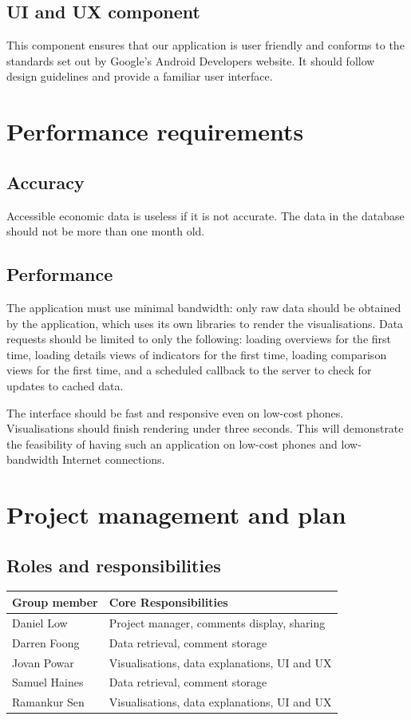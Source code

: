 \documentclass[12pt,a4paper,twoside]{article}
\begin{document}
\subsection{UI and UX component}
This component ensures that our application is user friendly and conforms to the standards set out by Google's Android Developers website. It should follow design guidelines and provide a familiar user interface.

\section{Performance requirements}

\subsection{Accuracy}
Accessible economic data is useless if it is not accurate. The data in the database should not be more than one month old.

\subsection{Performance}
The application must use minimal bandwidth: only raw data should be obtained by the application, which uses its own libraries to render the visualisations. Data requests should be limited to only the following: loading overviews for the first time, loading details views of indicators for the first time, loading comparison views for the first time, and a scheduled callback to the server to check for updates to cached data. 

The interface should be fast and responsive even on low-cost phones. Visualisations should finish rendering under three seconds. This will demonstrate the feasibility of having such an application on low-cost phones and low-bandwidth Internet connections.

\section{Project management and plan}

\subsection{Roles and responsibilities}
\setlength{\extrarowheight}{5pt}
\begin{tabular}{|m{5.5cm}|m{9.5cm}|}
\hline
\textbf{Group member} & \textbf{Core Responsibilities}\\
\hline
Daniel Low &  Project manager, comments display, sharing \\
\hline
Darren Foong & Data retrieval, comment storage \\
\hline
Jovan Powar & Visualisations, data explanations, UI and UX\\
\hline
Samuel Haines & Data retrieval, comment storage\\
\hline
Ramankur Sen & Visualisations, data explanations, UI and UX\\
\hline
\end{tabular}
\end{document}
